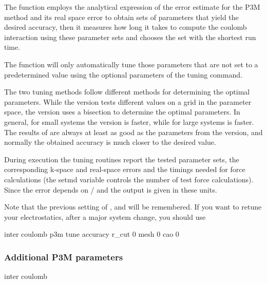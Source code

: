 The function employs the analytical expression of the error estimate
for the P3M method \cite{hockney88} and its real space error
\cite{kolafa92} to obtain sets of parameters that yield the desired
accuracy, then it measures how long it takes to compute the coulomb
interaction using these parameter sets and chooses the set with the
shortest run time.

The function will only automatically tune those parameters that are
not set to a predetermined value using the optional parameters of the
tuning command.

The two tuning methods follow different methods for determining the
optimal parameters. While the  version tests different
values on a grid in the parameter space, the  version
uses a bisection to determine the optimal parameters.  In general, for
small systems the  version is faster, while for large
systems  is faster. The results of 
are always at least as good as the parameters from the 
version, and normally the obtained accuracy is much closer to the
desired value.

During execution the tuning routines report the tested parameter sets,
the corresponding k-space and real-space errors and the timings needed
for force calculations (the setmd variable  controls the
number of test force calculations).  Since the error depends on
/ and \var{\alpha} the
output is given in these units.

Note that the previous setting of ,  and
 will be remembered.  If you want to retune your
electrostatics, \eg after a major system change, you should use
\begin{code}
  inter coulomb  p3m tune accuracy  r_cut 0 mesh 0 cao 0
\end{code}

\subsubsection{Additional P3M parameters}

\begin{essyntax}
  inter coulomb 
   
\end{essyntax}

